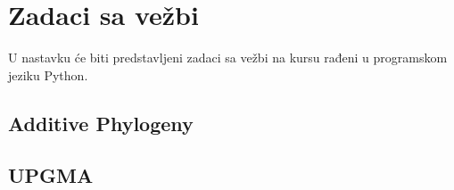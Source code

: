 \newpage

\section{Zadaci sa vežbi}
\setexamplecodestyle

U nastavku će biti predstavljeni zadaci sa vežbi na kursu rađeni u programskom jeziku Python.

\subsection{Additive Phylogeny}



\subsection{UPGMA}




